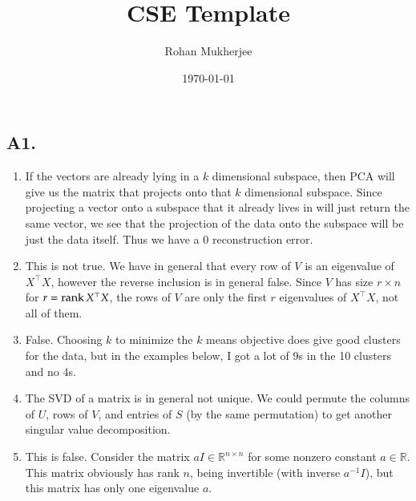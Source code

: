 \documentclass[12pt]{article}
\title{CSE Template}
\date{\today}
\author{Rohan Mukherjee}
\theoremstyle{definitionstyle}
\def\mbb#1{\mathbb{#1}}
\def \R{\mbb{R}}
\begin{document}
    \maketitle
    \subsection*{A1.}
    \begin{enumerate}[label=\alph*.]
        \item If the vectors are already lying in a $k$ dimensional subspace, then PCA will give us the matrix that projects onto that $k$ dimensional subspace. Since projecting a vector onto a subspace that it already lives in will just return the same vector, we see that the projection of the data onto the subspace will be just the data itself. Thus we have a 0 reconstruction error.
        \item This is not true. We have in general that every row of $V$ is an eigenvalue of $X^\top X$, however the reverse inclusion is in general false. Since $V$ has size $r \times n$ for $r = \rank X^\top X$, the rows of $V$ are only the first $r$ eigenvalues of $X^\top X$, not all of them.
        \item False. Choosing $k$ to minimize the $k$ means objective does give good clusters for the data, but in the examples below, I got a lot of 9s in the 10 clusters and no 4s. 
        \item The SVD of a matrix is in general not unique. We could permute the columns of $U$, rows of $V$, and entries of $S$ (by the same permutation) to get another singular value decomposition. 
        \item This is false. Consider the matrix $aI \in \R^{n \times n}$ for some nonzero constant $a \in \R$. This matrix obviously has rank $n$, being invertible (with inverse $a^{-1} I$), but this matrix has only one eigenvalue $a$.
    \end{enumerate}
\end{document}
